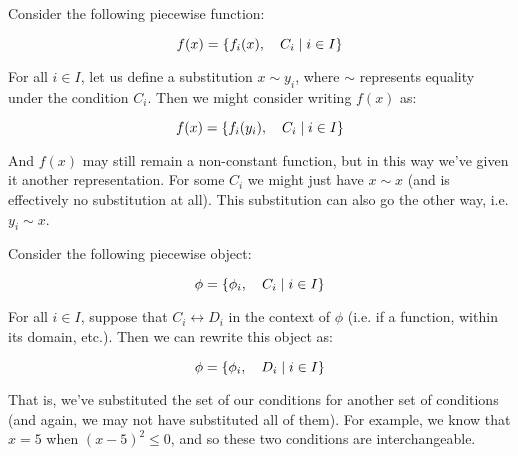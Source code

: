 \begin{theorem}
    Consider the following piecewise function:

    $$
        f(x) = \{f_i(x),\quad C_i\mid i\in I\}
    $$

    For all $i\in I$, let us define a substitution $x\sim y_i$, where $\sim$ represents equality under the condition $C_i$. Then we might consider writing $f(x)$ as:

    $$
        f(x) = \{f_i(y_i),\quad C_i\mid i\in I\}
    $$

    And $f(x)$ may still remain a non-constant function, but in this way we've given it another representation. For some $C_i$ we might just have $x\sim x$ (and is effectively no substitution at all). This substitution can also go the other way, i.e. $y_i\sim x$.
\end{theorem}

\begin{theorem}
    Consider the following piecewise object:

    $$
        \phi=\{\phi_i,\quad C_i\mid i\in I\}
    $$

    For all $i\in I$, suppose that $C_i \leftrightarrow D_i$ in the context of $\phi$ (i.e. if a function, within its domain, etc.). Then we can rewrite this object as:

    $$
        \phi=\{\phi_i,\quad D_i\mid i\in I\}
    $$ 

    That is, we've substituted the set of our conditions for another set of conditions (and again, we may not have substituted all of them). For example, we know that $x=5$ when $(x-5)^2\leq 0$, and so these two conditions are interchangeable.
\end{theorem}

